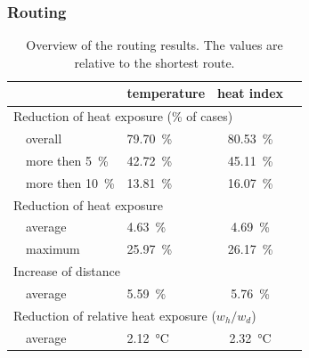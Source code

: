 \subsubsection{Routing}

\begin{table}
	\centering
	\begin{tabular}{lp{9.25cm}lcc}
		\toprule
		& & temperature & heat index \\
		\midrule
		\multicolumn{4}{l}{Reduction of heat exposure (\% of cases) }   \\
		& overall  & \SI{79.70}{\percent} & \SI{80.53}{\percent}  \\
		& more then \SI{5}{\percent} & \SI{42.72}{\percent} & \SI{45.11}{\percent} \\
		& more then \SI{10}{\percent} & \SI{13.81}{\percent} & \SI{16.07}{\percent} \\
		\multicolumn{4}{l}{Reduction of heat exposure}  \\
		& average  & \SI{4.63}{\percent} & \SI{4.69}{\percent}  \\
		& maximum  & \SI{25.97}{\percent} & \SI{26.17 }{\percent}  \\
		\multicolumn{4}{l}{Increase of distance}  \\
		& average & \SI{5.59}{\percent} & \SI{5.76}{\percent}  \\
		\multicolumn{4}{l}{Reduction of relative heat exposure ($w_h / w_d$)}  \\
		& average  & \SI{2.12}{\celsius} & \SI{2.32}{\celsius}  \\
		\bottomrule
	\end{tabular}
	\caption{Overview of the routing results. The values are relative to the shortest route. \label{tab:results-routing}}
\end{table}

